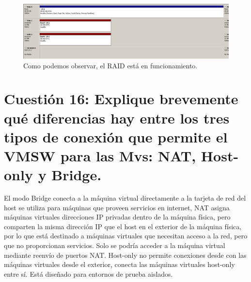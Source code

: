 \begin{figure}[H]
\centering
\includegraphics[scale=0.5]{raid7}
\caption{Como podemos observar, el RAID está en funcionamiento.}
\end{figure}


\section{Cuestión 16: Explique brevemente qué diferencias hay entre los tres tipos de conexión que permite el VMSW para las Mvs: NAT, Host-only y Bridge.}

El modo Bridge conecta a la máquina virtual directamente a la tarjeta de red del host se utiliza para máquinas que proveen servicios en internet, NAT asigna máquinas virtuales direcciones IP privadas dentro de la máquina física, pero comparten la misma dirección IP que el host en el exterior de la máquina física, por lo que está destinado a máquinas virtuales que necesitan acceso a la red, pero que no proporcionan servicios. Solo se podría acceder a la máquina virtual mediante reenvío de puertos NAT. Host-only no permite conexiones desde con las máquinas virtuales desde el exterior, conecta las máquinas virtuales host-only entre sí. Está diseñado para entornos de prueba aislados. \cite{25}

\newpage





